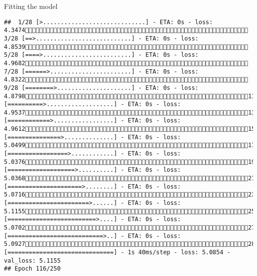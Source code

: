 \documentclass[
  ignorenonframetext,
]{beamer}
\begin{document}
\begin{frame}[fragile]{Fitting the model}
\begin{verbatim}
##  1/28 [>.............................] - ETA: 0s - loss: 4.3474 3/28 [==>...........................] - ETA: 0s - loss: 4.8539 5/28 [====>.........................] - ETA: 0s - loss: 4.9682 7/28 [======>.......................] - ETA: 0s - loss: 4.8322 9/28 [========>.....................] - ETA: 0s - loss: 4.879811/28 [==========>...................] - ETA: 0s - loss: 4.953713/28 [============>.................] - ETA: 0s - loss: 4.961215/28 [===============>..............] - ETA: 0s - loss: 5.049917/28 [=================>............] - ETA: 0s - loss: 5.037619/28 [===================>..........] - ETA: 0s - loss: 5.036821/28 [=====================>........] - ETA: 0s - loss: 5.071623/28 [=======================>......] - ETA: 0s - loss: 5.115525/28 [=========================>....] - ETA: 0s - loss: 5.070227/28 [===========================>..] - ETA: 0s - loss: 5.092728/28 [==============================] - 1s 40ms/step - loss: 5.0854 - val_loss: 5.1155
## Epoch 116/250

\end{verbatim}
\end{frame}
\end{document}
